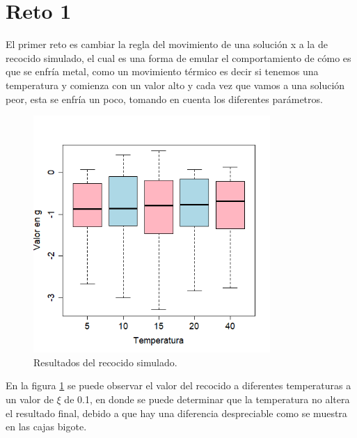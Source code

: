 \documentclass{article}
\begin{document}
\section{Reto 1}\label{ret}

El primer reto \citep{elisa} es cambiar la regla del movimiento de una soluci\'on x a la de recocido simulado, el cual es una forma de emular el comportamiento de c\'omo es que se enfr\'ia metal, como un movimiento t\'ermico es decir si tenemos una temperatura y comienza con un valor alto y cada vez que vamos a una soluci\'on peor, esta se enfr\'ia un poco, tomando en cuenta los diferentes par\'ametros.

 \begin{figure}[H]
       \begin{center}
\includegraphics[width=9cm]{r1.png}
  \end{center}
\caption{Resultados del recocido simulado.} 
\label{f7}
\end{figure}

En la figura \ref{f7} se puede observar el valor del recocido a diferentes temperaturas a un valor de $\xi$ de 0.1, en donde se puede determinar que la temperatura no altera el resultado final, debido a que hay una diferencia despreciable como se muestra en las cajas bigote. 

  
  
\end{document}
